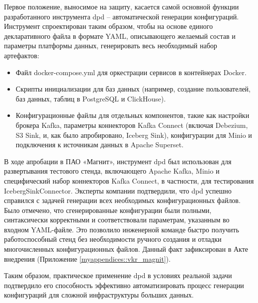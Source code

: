 Первое положение, выносимое на защиту, касается самой основной функции разработанного инструмента dpd – автоматической генерации конфигураций. Инструмент спроектирован таким образом, чтобы на основе единого декларативного файла в формате YAML, описывающего желаемый состав и параметры платформы данных, генерировать весь необходимый набор артефактов:
\begin{itemize}
    \item Файл docker-compose.yml для оркестрации сервисов в контейнерах Docker.
    \item Скрипты инициализации для баз данных (например, создание пользователей, баз данных, таблиц в PostgreSQL и ClickHouse).
    \item Конфигурационные файлы для отдельных компонентов, такие как настройки брокера Kafka, параметры коннекторов Kafka Connect (включая Debezium, S3 Sink, и, как было апробировано, Iceberg Sink), конфигурации для Minio и подключения к источникам данных в Apache Superset.
\end{itemize}
В ходе апробации в ПАО «Магнит», инструмент dpd был использован для развертывания тестового стенда, включающего Apache Kafka, Minio и специфический набор коннекторов Kafka Connect, в частности, для тестирования IcebergSinkConnector. Эксперты компании подтвердили, что dpd успешно справился с задачей генерации всех необходимых конфигурационных файлов. Было отмечено, что сгенерированные конфигурации были полными, синтаксически корректными и соответствовали параметрам, указанным во входном YAML-файле. Это позволило инженерной команде быстро получить работоспособный стенд без необходимости ручного создания и отладки многочисленных конфигурационных файлов. Данный факт зафиксирован в Акте внедрения (Приложение \ref{myappendices::vkr_magnit}).

Таким образом, практическое применение dpd в условиях реальной задачи подтвердило его способность эффективно автоматизировать процесс генерации конфигураций для сложной инфраструктуры больших данных.

